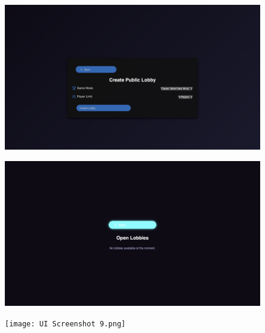 \begin{figure}[h!]
\centering
\includegraphics[width=1\linewidth]{UI Screenshot 7.png}
\label{fig:ui7}
\end{figure}

\begin{figure}[h!]
\centering
\includegraphics[width=1\linewidth]{UI Screenshot 8.png}
\label{fig:ui8}
\end{figure}

\begin{figure}[h!]
\centering
\texttt{[image: UI Screenshot 9.png]}
\label{fig:ui9}
\end{figure}

